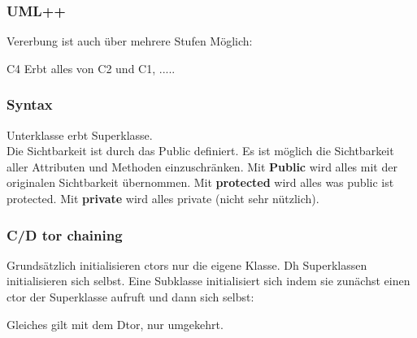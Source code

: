 \subsubsection{UML++}

Vererbung ist auch über mehrere Stufen Möglich:

\begin{center}
\end{center}

C4 Erbt alles von C2 und C1, .....

\subsubsection{Syntax}



Unterklasse erbt Superklasse.\\

Die Sichtbarkeit ist durch das Public definiert. 
Es ist möglich die Sichtbarkeit aller Attributen und Methoden einzuschränken. 
Mit \textbf{Public} wird alles mit der originalen Sichtbarkeit übernommen. 
Mit \textbf{protected} wird alles was public ist protected. 
Mit \textbf{private} wird alles private (nicht sehr nützlich).

\subsubsection{C/D tor chaining}

Grundsätzlich initialisieren ctors nur die eigene Klasse. 
Dh Superklassen initialisieren sich selbst. 
Eine Subklasse initialisiert sich indem sie zunächst einen ctor der Superklasse aufruft und dann sich selbst:



Gleiches gilt mit dem Dtor, nur umgekehrt.



